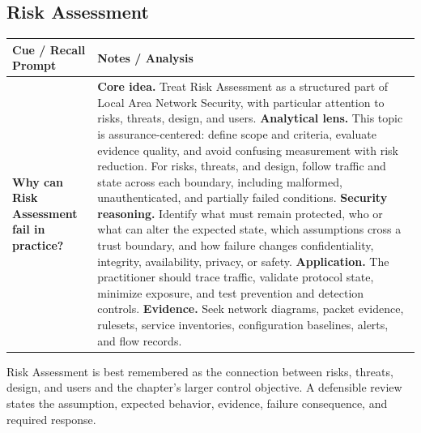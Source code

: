 \documentclass[11pt]{article}
\newcommand{\CornellHeader}{%
\rowcolor{Navy}\color{white}\bfseries Cue / Recall Prompt & \color{white}\bfseries Notes / Analysis\\\hline}
\newcommand{\CornellRow}[2]{%
\cellcolor{CueGray}\RaggedRight\textbf{#1} & \RaggedRight #2\\\hline}
\begin{document}
\subsection*{Risk Assessment}
\begin{longtable}{>{\RaggedRight\arraybackslash}p{}|>{\RaggedRight\arraybackslash}p{}}
\CornellHeader
\CornellRow{Why can Risk Assessment fail in practice?}{\textbf{Core idea.} Treat Risk Assessment as a structured part of Local Area Network Security, with particular attention to risks, threats, design, and users. \textbf{Analytical lens.} This topic is assurance-centered: define scope and criteria, evaluate evidence quality, and avoid confusing measurement with risk reduction. For risks, threats, and design, follow traffic and state across each boundary, including malformed, unauthenticated, and partially failed conditions. \textbf{Security reasoning.} Identify what must remain protected, who or what can alter the expected state, which assumptions cross a trust boundary, and how failure changes confidentiality, integrity, availability, privacy, or safety. \textbf{Application.} The practitioner should trace traffic, validate protocol state, minimize exposure, and test prevention and detection controls. \textbf{Evidence.} Seek network diagrams, packet evidence, rulesets, service inventories, configuration baselines, alerts, and flow records.}
\end{longtable}
\begin{topicsummary}
Risk Assessment is best remembered as the connection between risks, threats, design, and users and the chapter's larger control objective. A defensible review states the assumption, expected behavior, evidence, failure consequence, and required response.
\end{topicsummary}
\end{document}
